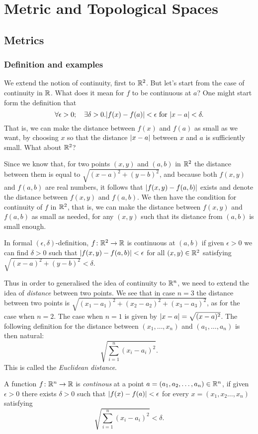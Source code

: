 \documentclass[main.tex]{subfiles}
\begin{document}
	\chapter{Metric and Topological Spaces}
	\section{Metrics}
	\subsection{Definition and examples}
		We extend the notion of continuity, first to $\mathbb R^2$.
		But let's start from the case of continuity in $\mathbb R$. What does it mean for $f$ to be continuous at $a$? One might start form the definition that
		\begin{equation*}
			\forall\epsilon > 0;\quad \exists\delta > 0. \lvert f(x) - f(a)\rvert < \epsilon \text{ for } \lvert x - a\rvert < \delta.
		\end{equation*}
		That is, we can make the distance between $f(x)$ and $f(a)$ as small as we want, by choosing $x$ so that the distance $\lvert x - a\rvert$ between $x$ and $a$ is sufficiently small. What about $\mathbb R^2$?
		
		Since we know that, for two points $(x,y)$ and $(a,b)$ in $\mathbb R^2$ the distance between them is equal to $\sqrt{(x - a)^2 + (y - b)^2}$, and because both $f(x,y)$ and $f(a,b)$ are real numbers, it follows that $\lvert f(x, y) - f(a, b)\rvert$ exists and denote the distance between $f(x,y)$ and $f(a,b)$. We then have the condition for continuity of $f$ in $\mathbb R^2$, that is, we can make the distance between $f(x,y)$ and $f(a,b)$ as small as needed, for any $(x,y)$ such that its distance from $(a, b)$ is small enough.
		
		In formal $(\epsilon, \delta)$-definition, $f\colon\mathbb R^2\to\mathbb R$ is continuous at $(a,b)$ if given $\epsilon > 0$ we can find $\delta>0$ such that $\lvert f(x, y) - f(a, b)\rvert < \epsilon $ for all $(x,y) \in \mathbb R^2$ satisfying $\sqrt{(x - a)^2 + (y - b)^2} < \delta$.
		
		Thus in order to generalised the idea of continuity to $\mathbb R^n$, we need to extend the idea of \textit{distance} between two points. We see that in case $n = 3$ the distance between two points is $\sqrt{(x_1 - a_1)^2 + (x_2 - a_2)^2 + (x_3 - a_3)^2}$, as for the case when $n = 2$. The case when $n = 1$ is given by $\lvert x - a\rvert = \sqrt{(x - a)^2}$. The following definition for the distance between $(x_1, \ldots, x_n)$ and $(a_1,\ldots,a_n)$ is then natural:
		\begin{equation*}
			\sqrt{\sum_{i = 1}^n (x_i - a_i)^2}.
		\end{equation*}
		This is called the \textit{Euclidean distance}.
		\begin{definition}
			A function $f \colon \mathbb R^n \rightarrow \mathbb R$ is \textit{continous} at a point $a = (a_1, a_2, \ldots, a_n) \in \mathbb R^n$, if given $\epsilon >0$ there exists $\delta > 0$ such that $\lvert f(x) - f(a)\rvert < \epsilon$ for every $x = (x_1, x_2 \ldots, x_n)$ satisfying
			\begin{equation*}
				\sqrt{\sum_{i = 1}^{n} \left(x_i - a_i\right)^2} < \delta.
			\end{equation*}
		\end{definition}
	
\end{document}
